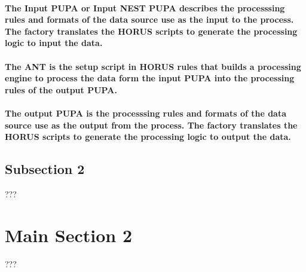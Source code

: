 \paragraph{The Input PUPA or Input NEST PUPA describes the processsing rules and formats of the data source use as the input to the process. The factory translates the HORUS scripts to generate the processing logic to input the data.}
\paragraph{The ANT is the setup script in HORUS rules that builds a processing engine to process the data form the input PUPA into the processing rules of the output PUPA. }
\paragraph{The output PUPA is the processsing rules and formats of the data source use as the output from the process. The factory translates the HORUS scripts to generate the processing logic to output the data.}


\subsection{Subsection 2}

???


\section{Main Section 2}

???

